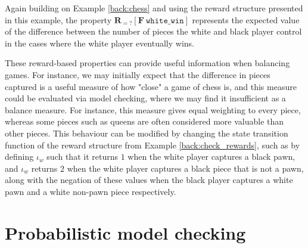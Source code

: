 \begin{example}
\label{back:chess_reward}
Again building on Example \ref{back:chess} and using the reward structure presented in this example, the property $\mathbf{R}_{=?} [\mathbf{F}\ \mathtt{white\_win}]$ represents the expected value of the difference between the number of pieces the white and black player control in the cases where the white player eventually wins. 
\end{example}

These reward-based properties can provide useful information when balancing games. For instance, we may initially expect that the difference in pieces captured is a useful measure of how "close" a game of chess is, and this measure could be evaluated via model checking, where we may find it insufficient as a balance measure. For instance, this measure gives equal weighting to every piece, whereas some pieces such as queens are often considered more valuable than other pieces. This behaviour can be modified by changing the state transition function of the reward structure from Example \ref{back:check_rewards}, such as by defining $\iota_w$ such that it returns $1$ when the white player captures a black pawn, and $\iota_w$ returns $2$ when the white player captures a black piece that is not a pawn, along with the negation of these values when the black player captures a white pawn and a white non-pawn piece respectively.

\section{Probabilistic model checking}
\label{back:prob_mod_check}





